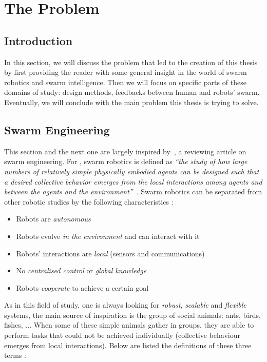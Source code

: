 \documentclass[a4paper, 12pt]{report}
\newcommand{\quot}[1]{\textit{\enquote{#1}}}
\begin{document}
\chapter{The Problem}
	\section{Introduction}
	
	In this section, we will discuss the problem that led to the creation of this thesis by first providing the reader with some general insight in the world of swarm robotics and swarm intelligence. Then we will focus on specific parts of these domains of study: design methods, feedbacks between human and robots' swarm. Eventually, we will conclude with the main problem this thesis is trying to solve.
	
	\section{Swarm Engineering}
	
	This section and the next one are largely inspired by~\citet{brambilla2013swarm}, a reviewing article on swarm engineering. For \citet{csahin2005swarm}, swarm robotics is defined as \quot{the study of how large numbers of relatively simple physically embodied agents can be designed such that a desired collective behavior emerges from the local interactions among agents and between the agents and the environment}~\citep{csahin2005swarm}. Swarm robotics can be separated from other robotic studies by the following characteristics \citep{brambilla2013swarm}:
	
\begin{itemize}
\item Robots are \emph{autonomous}
\item Robots evolve \emph{in the environment} and can interact with it
\item Robots' interactions are \emph{local} (sensors and communications)
\item No \emph{centralised control} or \emph{global knowledge}
\item Robots \emph{cooperate} to achieve a certain goal
\end{itemize}

As in this field of study, one is always looking for \emph{robust}, \emph{scalable} and \emph{flexible} systems, the main source of inspiration is the group of social animals: ants, birds, fishes, ... When some of these simple animals gather in groups, they are able to perform tasks that could not be achieved individually (collective behaviour emerges from local interactions). Below are listed the definitions of these three terms \citep{brambilla2013swarm}:
\end{document}
